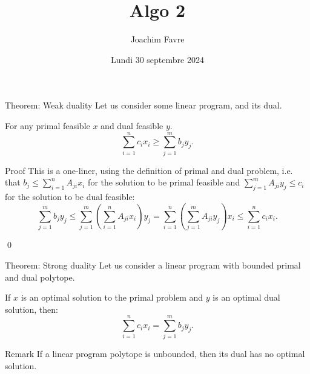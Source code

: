 \documentclass[a4paper]{article}
\title{Algo 2}
\author{Joachim Favre}
\date{Lundi 30 septembre 2024}
\begin{document}
\maketitle


\begin{parag}{Theorem: Weak duality}
    Let us consider some linear program, and its dual.

    For any primal feasible $x$ and dual feasible $y$.
    \[\sum_{i=1}^{n} c_i x_i \geq \sum_{j=1}^{m} b_j y_j.\]

    \begin{subparag}{Proof}
        This is a one-liner, using the definition of primal and dual problem, i.e. that $b_j \leq \sum_{i=1}^{n} A_{ji} x_i$ for the solution to be primal feasible and $\sum_{j=1}^{m} A_{ji} y_j \leq c_i$ for the solution to be dual feasible:
        \[\sum_{j=1}^{m} b_j y_j \leq \sum_{j=1}^{m} \left(\sum_{i=1}^{n} A_{ji} x_i \right) y_j = \sum_{i=1}^{n} \left(\sum_{j=1}^{m} A_{ji} y_j\right) x_i \leq \sum_{i=1}^{n} c_i x_i.\]

        \qed
    \end{subparag}
\end{parag}

\begin{parag}{Theorem: Strong duality}
    Let us consider a linear program with bounded primal and dual polytope.

    If $x$ is an optimal solution to the primal problem and $y$ is an optimal dual solution, then: 
    \[\sum_{i=1}^{n} c_i x_i = \sum_{j=1}^{m} b_j y_j.\]

    \begin{subparag}{Remark}
        If a linear program polytope is unbounded, then its dual has no optimal solution.
    \end{subparag}
\end{parag}
\end{document}
